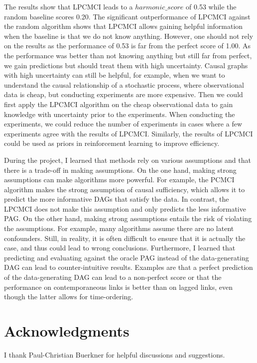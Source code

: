 \documentclass[conference]{IEEEtran}
\begin{document}
The results show that LPCMCI leads to a $harmonic\_score$ of 0.53 while the random baseline scores 0.20.
The significant outperformance of LPCMCI against the random algorithm shows that LPCMCI allows gaining helpful information when the baseline is that we do not know anything. However, one should not rely on the results as the performance of 0.53 is far from the perfect score of 1.00.
As the performance was better than not knowing anything but still far from perfect, we gain predictions but should treat them with high uncertainty. Causal graphs with high uncertainty can still be helpful, for example, when we want to understand the causal relationship of a stochastic process, where observational data is cheap, but conducting experiments are more expensive.
Then we could first apply the LPCMCI algorithm on the cheap observational data to gain knowledge with uncertainty prior to the experiments. When conducting the experiments, we could reduce the number of experiments in cases where a few experiments agree with the results of LPCMCI. 
Similarly, the results of LPCMCI could be used as priors in reinforcement learning to improve efficiency.

During the project, I learned that methods rely on various assumptions and that there is a trade-off in making assumptions. On the one hand, making strong assumptions can make algorithms more powerful. For example, the PCMCI algorithm makes the strong assumption of causal sufficiency, which allows it to predict the more informative DAGs that satisfy the data. In contrast, the LPCMCI does not make this assumption and only predicts the less informative PAG. On the other hand, making strong assumptions entails the risk of violating the assumptions. For example, many algorithms assume there are no latent confounders. Still, in reality, it is often difficult to ensure that it is actually the case, and thus could lead to wrong conclusions.
Furthermore, I learned that predicting and evaluating against the oracle PAG instead of the data-generating DAG can lead to counter-intuitive results. Examples are that a perfect prediction of the data-generating DAG can lead to a non-perfect score or that the performance on contemporaneous links is better than on lagged links, even though the latter allows for time-ordering.


\section{Acknowledgments}
I thank Paul-Christian Buerkner for helpful discussions and suggestions.







\end{document}
